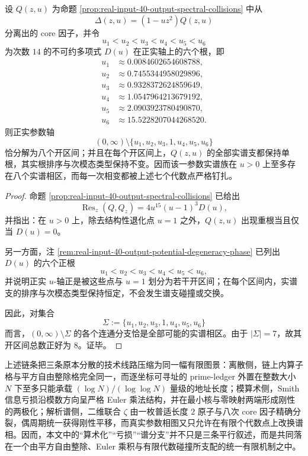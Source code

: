 \begin{theorem}[正实参数轴的有限谱相剖分]\label{thm:conclusion-realinput40-positive-axis-finite-spectral-phase-partition}
设 \(Q(z,u)\) 为命题 \ref{prop:real-input-40-output-spectral-collisions} 中从
\[
\Delta(z,u)=(1-uz^2)Q(z,u)
\]
分离出的 core 因子，并令
\[
u_1<u_2<u_3<u_4<u_5<u_6
\]
为次数 \(14\) 的不可约多项式 \(D(u)\) 在正实轴上的六个根，即
\[
\begin{aligned}
u_1&\approx 0.0084602654608788,\\
u_2&\approx 0.7455344958029896,\\
u_3&\approx 0.9328372624859649,\\
u_4&\approx 1.0547964213679192,\\
u_5&\approx 2.0903923780490870,\\
u_6&\approx 15.5228207044268520.
\end{aligned}
\]
则正实参数轴
\[
(0,\infty)\setminus\{u_1,u_2,u_3,1,u_4,u_5,u_6\}
\]
恰分解为八个开区间；并且在每个开区间上，\(Q(z,u)\) 的全部实谱支都保持单根，其实根排序与次模态类型保持不变。因而该一参数实谱族在 \(u>0\) 上至多存在八个实谱相区，而每一次相变都被上述七个代数点严格钉扎。
\end{theorem}
\begin{proof}
命题 \ref{prop:real-input-40-output-spectral-collisions} 已给出
\[
\operatorname{Res}_z(Q,Q_z)=4u^{15}(u-1)^3D(u),
\]
并指出：在 \(u>0\) 上，除去结构性退化点 \(u=1\) 之外，\(Q(z,u)\) 出现重根当且仅当 \(D(u)=0\)。

另一方面，注 \ref{rem:real-input-40-output-potential-degeneracy-phase} 已列出 \(D(u)\) 的六个正根
\[
u_1<u_2<u_3<u_4<u_5<u_6,
\]
并说明正实 \(u\)-轴正是被这些点与 \(u=1\) 划分为若干开区间；在每个区间内，实谱支的排序与次模态类型保持恒定，不会发生谱支碰撞或交换。

因此，对集合
\[
\Sigma:=\{u_1,u_2,u_3,1,u_4,u_5,u_6\}
\]
而言，\((0,\infty)\setminus\Sigma\) 的各个连通分支恰是全部可能的实谱相区。由于 \(|\Sigma|=7\)，故其开区间总数正好为 \(8\)。证毕。
\end{proof}

\noindent
上述链条把三条原本分散的技术线路压缩为同一幅有限图景：离散侧，链上内算子格与平方自由整除格完全同一，而逐坐标可寻址的 prime-ledger 外置在整数大小 \(N\) 下至多只能承载 \((\log N)/(\log\log N)\) 量级的地址长度；模算术侧，Smith 信息亏损沿模数方向呈严格 Euler 乘法结构，并在最小核与零映射两端形成刚性的两极化；解析谱侧，二维联合 \(\zeta\) 由一枚普适长度 \(2\) 原子与八次 core 因子精确分裂，偶周期统一获得刚性平移，而真实参数相图又只允许在有限个代数点上改换谱相。因而，本文中的“算术化”“亏损”“谱分支”并不只是三条平行叙述，而是共同落在一个由平方自由整除、Euler 乘积与有限代数碰撞所支配的统一有限机制之中。

\endinput
